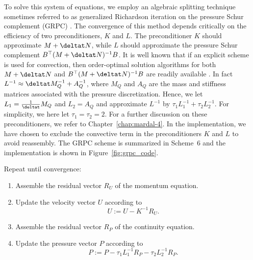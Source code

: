

To solve this system of equations, we employ an algebraic splitting
technique sometimes referred to as generalized Richardson iteration on
the pressure Schur complement (GRPC) \citep{Turek1999}. The
convergence of this method depends critically on the efficiency of two
preconditioners, $K$ and $L$. The preconditioner $K$ should
approximate $M + \deltat N$, while $L$ should approximate the
pressure Schur complement $B^{\top} (M + \deltat N)^{-1} B$. It is well
known that if an explicit scheme is used for convection, then
order-optimal solution algorithms for both $M + \deltat N$ and $B^{\top} (M
+ \deltat N)^{-1} B$ are readily available
\citep{CahouetChabard1988,Turek1999,MardalWinther2004,MardalWinther11}. In
fact $L^{-1} \approx \deltat M_Q^{-1} + A_Q^{-1}$, where $M_Q$ and
$A_Q$ are the mass and stiffness matrices associated with the pressure
discretization. Hence, we let $L_1=\frac{1}{\deltat} M_Q$ and
${L}_2=A_Q$ and approximate $L^{-1}$ by $\tau_1 L_1^{-1} + \tau_2
{L}_2^{-1}$. For simplicity, we here let $\tau_1 = \tau_2 = 2$.  For a
further discussion on these preconditioners, we refer to
Chapter~\ref{chap:mardal-4}. In the implementation, we have chosen to
exclude the convective term in the preconditioners $K$ and $L$ to
avoid reassembly.  The GRPC scheme is summarized in Scheme~6 and the
implementation is shown in Figure~\ref{fig:grpc_code}.

{
\item
  Repeat until convergence:

  \begin{enumerate}
  \item
    Assemble the residual vector $R_U$ of the momentum equation.
  \item
    Update the velocity vector $U$ according to
    \begin{equation}\label{eq:grpc,1}
      U := U - K^{-1} R_U.
    \end{equation}
  \item
    Assemble the residual vector $R_P$ of the continuity equation.
  \item
    Update the pressure vector $P$ according to
    \begin{equation}\label{eq:grpc,2}
      P := P - \tau_1 L_1^{-1} R_P - \tau_2 {L}_2^{-1} R_P.
    \end{equation}
  \end{enumerate}
}

